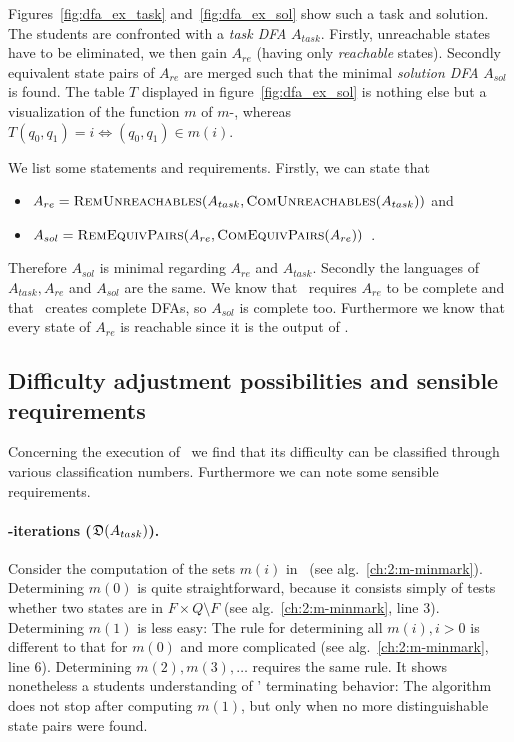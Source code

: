\noindent Figures~\ref{fig:dfa_ex_task} and~\ref{fig:dfa_ex_sol} show such a task and solution. The students are confronted with a \emph{task DFA} $A_{task}$. Firstly, unreachable states have to be eliminated, we then gain $A_{re}$ (having only \emph{reachable} states). Secondly equivalent state pairs of $A_{re}$ are merged such that the minimal \emph{solution DFA} $A_{sol}$ is found. The table $T$ displayed in figure~\ref{fig:dfa_ex_sol} is nothing else but a visualization of the function $m$ of $m$-\CompDist, whereas $T(q_0, q_1) = i \Leftrightarrow (q_0, q_1) \in m(i)$.

We list some statements and requirements. Firstly, we can state that
\begin{itemize}
	\item $A_{re} = \textsc{RemUnreachables}(A_{task}, \textsc{ComUnreachables}(A_{task}))$ and
	\item $A_{sol} = \textsc{RemEquivPairs}(A_{re}, \textsc{ComEquivPairs}(A_{re}))$\ .
\end{itemize}
Therefore $A_{sol}$ is minimal regarding $A_{re}$ and $A_{task}$. Secondly the languages of $A_{task}, A_{re}$ and $A_{sol}$ are the same. We know that \CompDist\ requires $A_{re}$ to be complete and that \RemEq\ creates complete DFAs, so $A_{sol}$ is complete too. Furthermore we know that every state of $A_{re}$ is reachable since it is the output of \RemUnr.

\subsection{Difficulty adjustment possibilities and sensible requirements}\label{ch:2:requirements-analysis}

Concerning the execution of \MinAlg\ we find that its difficulty can be classified through various classification numbers. Furthermore we can note some sensible requirements.

\paragraph*{\CompDist-iterations ($\mathfrak{D}(A_{task})$).}

Consider the computation of the sets $m(i)$ in \CompDist\ (see alg.~\ref{ch:2:m-minmark}). Determining $m(0)$ is quite straightforward, because it consists simply of tests whether two states are in $F \times Q \setminus F$ (see alg.~\ref{ch:2:m-minmark}, line 3). Determining $m(1)$ is less easy: The rule for determining all $m(i), i > 0$ is different to that for $m(0)$ and more complicated (see alg.~\ref{ch:2:m-minmark}, line 6). Determining $m(2), m(3), \ldots$ requires the same rule. It shows nonetheless a students understanding of \CompDist' terminating behavior: The algorithm does not stop after computing $m(1)$, but only when no more distinguishable state pairs were found.

